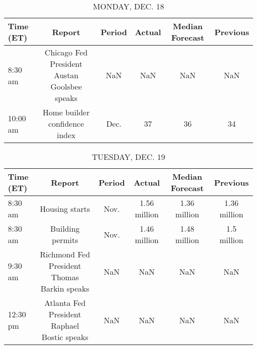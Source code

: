 \documentclass{article}%
\begin{document}
%
\normalsize%


\begin{table}[htbp]%
\caption{MONDAY, DEC. 18}%
\centering%
\begin{adjustbox}{width=1\textwidth}%
\begin{tabular}{lccccc}
\toprule
Time (ET) &                                       Report & Period & Actual & Median Forecast & Previous \\
\midrule
  8:30 am & Chicago Fed President Austan Goolsbee speaks &    NaN &    NaN &             NaN &      NaN \\
 10:00 am &                Home builder confidence index &   Dec. &     37 &              36 &       34 \\
\bottomrule
\end{tabular}
%
\end{adjustbox}%
\end{table}

%


\begin{table}[htbp]%
\caption{TUESDAY, DEC. 19}%
\centering%
\begin{adjustbox}{width=1\textwidth}%
\begin{tabular}{lccccc}
\toprule
Time (ET) &                                      Report & Period &       Actual & Median Forecast &     Previous \\
\midrule
  8:30 am &                              Housing starts &   Nov. & 1.56 million &    1.36 million & 1.36 million \\
  8:30 am &                            Building permits &   Nov. & 1.46 million &    1.48 million &  1.5 million \\
  9:30 am & Richmond Fed President Thomas Barkin speaks &    NaN &          NaN &             NaN &          NaN \\
 12:30 pm & Atlanta Fed President Raphael Bostic speaks &    NaN &          NaN &             NaN &          NaN \\
\bottomrule
\end{tabular}
%
\end{adjustbox}%
\end{table}

%
\end{document}
